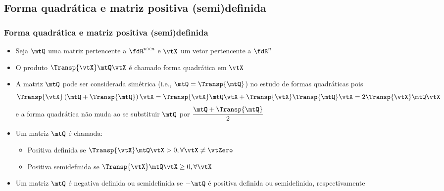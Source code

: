 \subsection{Forma quadrática e matriz positiva (semi)definida}

\begin{frame}
  \frametitle{Forma quadrática e matriz positiva (semi)definida}
  \begin{itemize}
    \item Seja $\mtQ$ uma matriz pertencente a $\fdR^{n\times n}$ e $\vtX$ um vetor pertencente a $\fdR^n$
    \item O produto $\Transp{\vtX}\mtQ\vtX$ é chamado {\alert{forma quadrática}} em $\vtX$
    \item A matriz $\mtQ$ pode ser considerada simétrica (i.e., $\mtQ = \Transp{\mtQ}$) no estudo de formas quadráticas pois
    \begin{equation}
      \Transp{\vtX}\left(\mtQ + \Transp{\mtQ}\right)\vtX = \Transp{\vtX}\mtQ\vtX + \Transp{\vtX}\Transp{\mtQ}\vtX = 2\Transp{\vtX}\mtQ\vtX
    \end{equation}
    e a forma quadrática não muda ao se substituir $\mtQ$ por $\dfrac{\mtQ + \Transp{\mtQ}}{2}$
    \item Um matriz $\mtQ$ é chamada:
    \begin{itemize}
      \item {\alert{Positiva definida}} se $\Transp{\vtX}\mtQ\vtX > 0, \forall \vtX \neq \vtZero$
      \item {\alert{Positiva semidefinida}} se $\Transp{\vtX}\mtQ\vtX \geq 0, \forall \vtX$
    \end{itemize}
    \item Um matriz $\mtQ$ é {\alert{negativa definida ou semidefinida}} se $-\mtQ$ é positiva definida ou semidefinida, respectivamente
  \end{itemize}
\end{frame}

